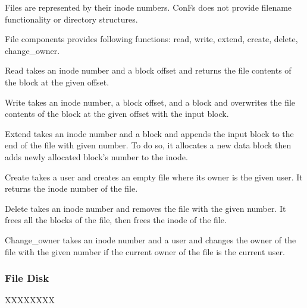 Files are represented by their inode numbers. ConFs does not provide filename functionality or directory structures.

File components provides following functions: read, write, extend, create, delete, change\_owner.

Read takes an inode number and a block offset and returns the file contents of the block at the given offset.

Write takes an inode number, a block offset, and a block and overwrites the file contents of the block at the given offset with the input block.

Extend takes an inode number and a block and appends the input block to the end of the file with given number. To do so, it allocates a new data block then adds newly allocated block's number to the inode.

Create takes a user and creates an empty file where its owner is the given user. It returns the inode number of the file.

Delete takes an inode number and removes the file with the given number. It frees all the blocks of the file, then frees the inode of the file.

Change\_owner takes an inode number and a user and changes the owner of the file with the given number if the current owner of the file is the current user.

\subsubsection{File Disk}
{\color{red} XXXXXXXX}